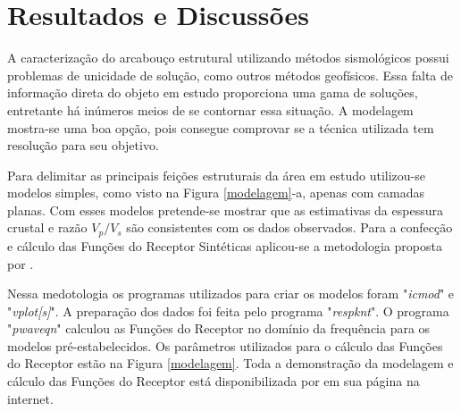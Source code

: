 \chapter{Resultados e Discussões}	

A caracterização do arcabouço estrutural utilizando métodos sismológicos possui problemas de unicidade de solução, como outros métodos geofísicos.  Essa falta de informação direta do objeto em estudo proporciona uma gama de soluções, entretante há inúmeros meios de se contornar essa situação. A modelagem mostra-se uma boa opção, pois consegue comprovar se a técnica utilizada tem resolução para seu objetivo.

Para delimitar as principais feições estruturais da área em estudo utilizou-se modelos simples, como visto na Figura \ref{modelagem}-a, apenas com camadas planas. Com esses modelos pretende-se mostrar que as estimativas da espessura crustal e razão $V_{p}/V_{s}$ são consistentes com os dados observados. Para a confecção e cálculo das Funções do Receptor Sintéticas aplicou-se a metodologia proposta por \cite{Ammon_waterlevel_1997}. 

Nessa medotologia os programas utilizados para criar os modelos foram "\textit{icmod}" e "\textit{vplot[s]}". A preparação dos dados foi feita pelo programa "\textit{respknt}". O programa "\textit{pwaveqn}" calculou as Funções do Receptor no domínio da frequência para os modelos pré-estabelecidos. Os parâmetros utilizados para o cálculo das Funções do Receptor estão na Figura \ref{modelagem}. Toda a demonstração da modelagem e cálculo das Funções do Receptor está disponibilizada por \cite{Ammon_waterlevel_1997} em sua página na internet.

